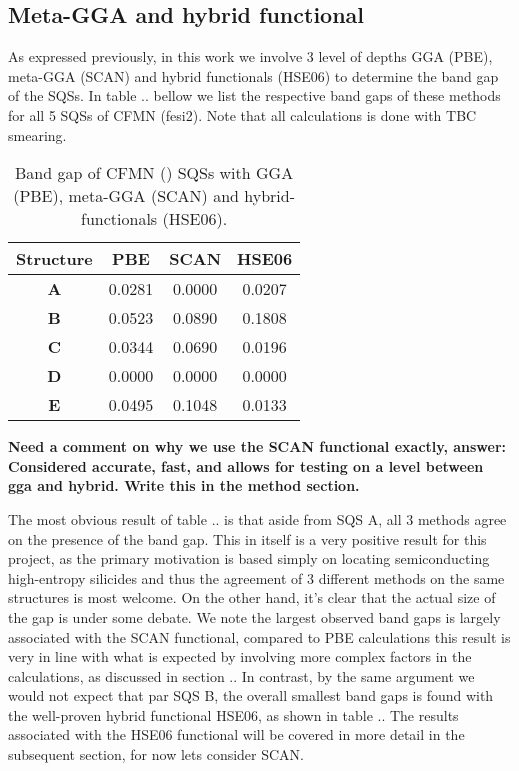 \subsection{Meta-GGA and hybrid functional}

As expressed previously, in this work we involve 3 level of depths GGA (PBE), meta-GGA (SCAN) and hybrid functionals (HSE06) to determine the band gap of the SQSs. In table .. bellow we list the respective band gaps of these methods for all 5 SQSs of CFMN (fesi2). Note that all calculations is done with TBC smearing.

\begin{table}[H]
\centering
\begin{tabular}{@{}cccc@{}}
\toprule
Structure  & PBE    & SCAN   & HSE06  \\ \midrule
\textbf{A} & 0.0281 & 0.0000 & 0.0207 \\
\textbf{B} & 0.0523 & 0.0890 & 0.1808 \\
\textbf{C} & 0.0344 & 0.0690 & 0.0196 \\
\textbf{D} & 0.0000 & 0.0000 & 0.0000 \\
\textbf{E} & 0.0495 & 0.1048 & 0.0133 \\ \bottomrule
\end{tabular}
\caption{Band gap of CFMN () SQSs with GGA (PBE), meta-GGA (SCAN) and hybrid-functionals (HSE06).}
\end{table}

\textbf{Need a comment on why we use the SCAN functional exactly, answer: Considered accurate, fast, and allows for testing on a level between gga and hybrid. Write this in the method section.}

The most obvious result of table .. is that aside from SQS A, all 3 methods agree on the presence of the band gap. This in itself is a very positive result for this project, as the primary motivation is based simply on locating semiconducting high-entropy silicides and thus the agreement of 3 different methods on the same structures is most welcome. On the other hand, it's clear that the actual size of the gap is under some debate. We note the largest observed band gaps is largely associated with the SCAN functional, compared to PBE calculations this result is very in line with what is expected by involving more complex factors in the calculations, as discussed in section .. In contrast, by the same argument we would not expect that par SQS B, the overall smallest band gaps is found with the well-proven hybrid functional HSE06, as shown in table .. The results associated with the HSE06 functional will be covered in more detail in the subsequent section, for now lets consider SCAN. 
 
